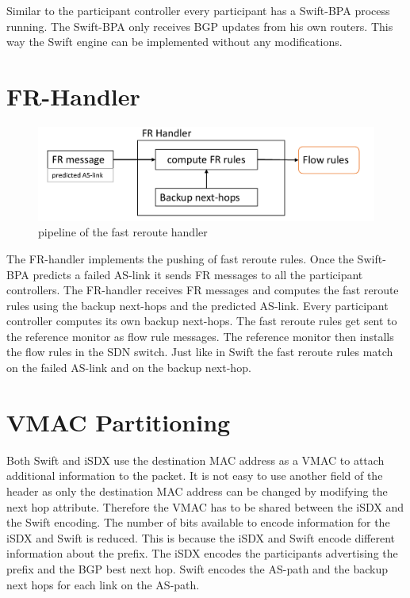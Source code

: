 Similar to the participant controller every participant has a Swift-BPA process running. The Swift-BPA only receives BGP updates from his own routers. This way the Swift engine can be implemented without any modifications.

\section{\label{chapter4:FR-handler}FR-Handler}

\begin{figure}[h]
\center
\includegraphics[scale = 0.6]{Figures/design_fr_handler_cropped.pdf}
\caption{pipeline of the fast reroute handler}
\end{figure}

The FR-handler implements the pushing of fast reroute rules.
Once the Swift-BPA predicts a failed AS-link it sends FR messages to all the participant controllers.
The FR-handler receives FR messages and computes the fast reroute rules using the backup next-hops and the predicted AS-link. Every participant controller computes its own backup next-hops. The fast reroute rules get sent to the reference monitor as flow rule messages. The reference monitor then installs the flow rules in the SDN switch. Just like in Swift the fast reroute rules match on the failed AS-link and on the backup next-hop.    

\newpage

\section{\label{chapter4:vmac_partitioning}VMAC Partitioning}

Both Swift and iSDX use the destination MAC address as a VMAC to attach additional information to the packet. It is not easy to use another field of the header as only the destination MAC address can be changed by modifying the next hop attribute. Therefore the VMAC has to be shared between the iSDX and the Swift encoding. The number of bits available to encode information for the iSDX and Swift is reduced. This is because the iSDX and Swift encode 
different information about the prefix. The iSDX encodes the participants advertising the prefix and the BGP best next hop. Swift encodes the AS-path and the backup next hops for each link on the AS-path.


